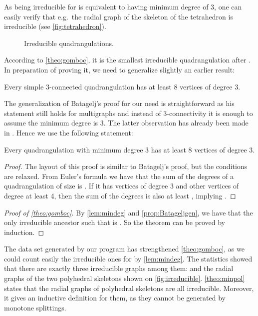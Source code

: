 \documentclass[]{article}
\begin{document}
As being irreducible for  is equivalent to having minimum degree of 3, one can easily verify that e.g.\  the radial graph of the skeleton of the tetrahedron is irreducible (see \autoref{fig:tetrahedron}).
\begin{figure}\centering
\qquad\qquad\qquad {}
\caption{Irreducible quadrangulations.}
\label{fig:irreducible}
\end{figure}
According to \autoref{theo:gomboc}, it is the smallest irreducible quadrangulation after .
In preparation of proving it, we need to generalize slightly an earlier result:
\begin{prop}
  \label{prop:Batagelj}
  Every simple 3-connected quadrangulation has at least 8 vertices of degree 3.
\end{prop}

The generalization of Batagelj's proof for our need is straightforward as his statement still holds for multigraphs and instead of 3-connectivity it is enough to assume the minimum degree is 3.
The latter observation has already been made in \cite{Brinkmann2005}.
Hence we use the following statement:

\begin{prop}\label{prop:Batageljgen}
  Every quadrangulation with minimum degree 3 has at least 8 vertices of degree 3.
\end{prop}

\begin{proof}The layout of this proof is similar to Batagelj's proof, but the conditions are relaxed.
From Euler's formula we have that the sum of the degrees of a quadrangulation of size  is .
If it has  vertices of degree 3 and  other vertices of degree at least 4, then the sum of the degrees is also at least , implying .
\end{proof}

\begin{proof}[Proof of \autoref*{theo:gomboc}]
  By \autoref{lem:mindeg} and \autoref{prop:Batageljgen}, we have that the only irreducible ancestor such that  is .
So the theorem can be proved by induction.
\end{proof}

The data set generated by our program has strengthened \autoref{theo:gomboc}, as we could count easily the irreducible ones for  by \autoref{lem:mindeg}.
The statistics showed that there are exactly three irreducible graphs among them:  and the radial graphs of the two polyhedral skeletons shown on \autoref{fig:irreducible}.
\autoref{theo:minpol} states that the radial graphs of polyhedral skeletons are all irreducible.
Moreover, it gives an inductive definition for them, as they cannot be generated by monotone splittings.
\end{document}
